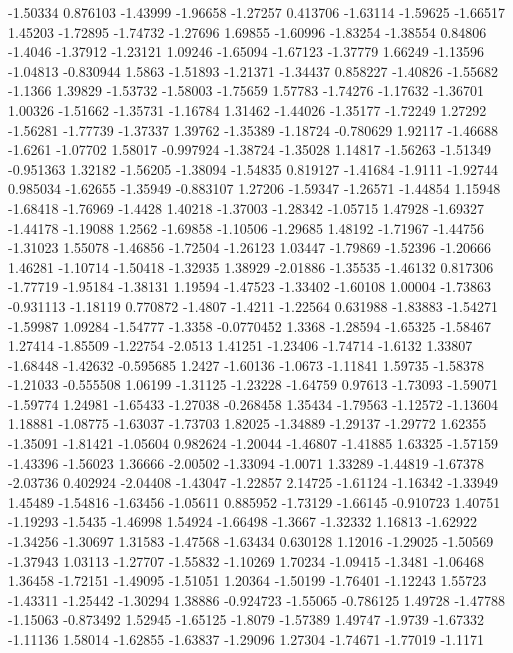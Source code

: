 \documentclass[9pt]{article}
\theoremstyle{plain}
\theoremstyle{definition}
\theoremstyle{remark}
\numberwithin{equation}{section}
\begin{document}
-1.50334
0.876103
-1.43999
-1.96658
-1.27257
0.413706
-1.63114
-1.59625
-1.66517
1.45203
-1.72895
-1.74732
-1.27696
1.69855
-1.60996
-1.83254
-1.38554
0.84806
-1.4046
-1.37912
-1.23121
1.09246
-1.65094
-1.67123
-1.37779
1.66249
-1.13596
-1.04813
-0.830944
1.5863
-1.51893
-1.21371
-1.34437
0.858227
-1.40826
-1.55682
-1.1366
1.39829
-1.53732
-1.58003
-1.75659
1.57783
-1.74276
-1.17632
-1.36701
1.00326
-1.51662
-1.35731
-1.16784
1.31462
-1.44026
-1.35177
-1.72249
1.27292
-1.56281
-1.77739
-1.37337
1.39762
-1.35389
-1.18724
-0.780629
1.92117
-1.46688
-1.6261
-1.07702
1.58017
-0.997924
-1.38724
-1.35028
1.14817
-1.56263
-1.51349
-0.951363
1.32182
-1.56205
-1.38094
-1.54835
0.819127
-1.41684
-1.9111
-1.92744
0.985034
-1.62655
-1.35949
-0.883107
1.27206
-1.59347
-1.26571
-1.44854
1.15948
-1.68418
-1.76969
-1.4428
1.40218
-1.37003
-1.28342
-1.05715
1.47928
-1.69327
-1.44178
-1.19088
1.2562
-1.69858
-1.10506
-1.29685
1.48192
-1.71967
-1.44756
-1.31023
1.55078
-1.46856
-1.72504
-1.26123
1.03447
-1.79869
-1.52396
-1.20666
1.46281
-1.10714
-1.50418
-1.32935
1.38929
-2.01886
-1.35535
-1.46132
0.817306
-1.77719
-1.95184
-1.38131
1.19594
-1.47523
-1.33402
-1.60108
1.00004
-1.73863
-0.931113
-1.18119
0.770872
-1.4807
-1.4211
-1.22564
0.631988
-1.83883
-1.54271
-1.59987
1.09284
-1.54777
-1.3358
-0.0770452
1.3368
-1.28594
-1.65325
-1.58467
1.27414
-1.85509
-1.22754
-2.0513
1.41251
-1.23406
-1.74714
-1.6132
1.33807
-1.68448
-1.42632
-0.595685
1.2427
-1.60136
-1.0673
-1.11841
1.59735
-1.58378
-1.21033
-0.555508
1.06199
-1.31125
-1.23228
-1.64759
0.97613
-1.73093
-1.59071
-1.59774
1.24981
-1.65433
-1.27038
-0.268458
1.35434
-1.79563
-1.12572
-1.13604
1.18881
-1.08775
-1.63037
-1.73703
1.82025
-1.34889
-1.29137
-1.29772
1.62355
-1.35091
-1.81421
-1.05604
0.982624
-1.20044
-1.46807
-1.41885
1.63325
-1.57159
-1.43396
-1.56023
1.36666
-2.00502
-1.33094
-1.0071
1.33289
-1.44819
-1.67378
-2.03736
0.402924
-2.04408
-1.43047
-1.22857
2.14725
-1.61124
-1.16342
-1.33949
1.45489
-1.54816
-1.63456
-1.05611
0.885952
-1.73129
-1.66145
-0.910723
1.40751
-1.19293
-1.5435
-1.46998
1.54924
-1.66498
-1.3667
-1.32332
1.16813
-1.62922
-1.34256
-1.30697
1.31583
-1.47568
-1.63434
0.630128
1.12016
-1.29025
-1.50569
-1.37943
1.03113
-1.27707
-1.55832
-1.10269
1.70234
-1.09415
-1.3481
-1.06468
1.36458
-1.72151
-1.49095
-1.51051
1.20364
-1.50199
-1.76401
-1.12243
1.55723
-1.43311
-1.25442
-1.30294
1.38886
-0.924723
-1.55065
-0.786125
1.49728
-1.47788
-1.15063
-0.873492
1.52945
-1.65125
-1.8079
-1.57389
1.49747
-1.9739
-1.67332
-1.11136
1.58014
-1.62855
-1.63837
-1.29096
1.27304
-1.74671
-1.77019
-1.1171
\end{document}
